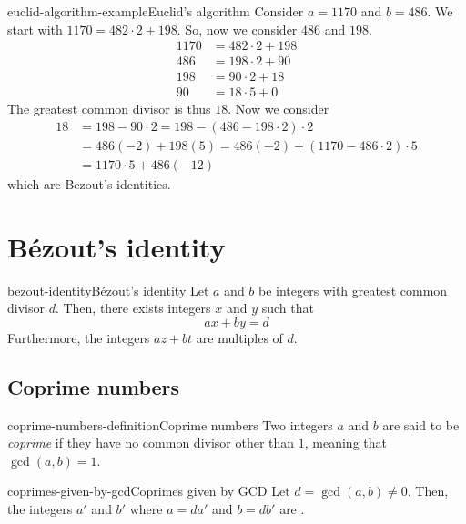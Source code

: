 \documentclass[preview]{standalone}
\begin{document}
\begin{snippetexample}{euclid-algorithm-example}{Euclid's algorithm}
    Consider \(a=1170\) and \(b=486\).
    We start with
    \(1170 = 482 \cdot 2 + 198\). So, now we consider \(486\) and \(198\).
    \begin{align*}
        1170 &= 482 \cdot 2 + 198 \\
        486 &= 198 \cdot 2 + 90 \\
        198 &= 90 \cdot 2 + 18 \\
        90 &= 18 \cdot 5 + 0
    \end{align*}
    The greatest common divisor is thus \(18\).
    Now we consider
    \begin{align*}
        18 &= 198 - 90\cdot 2 = 198 - (486 - 198 \cdot 2)\cdot 2 \\
        &= 486(-2) + 198(5) = 486(-2) + (1170 - 486\cdot 2) \cdot 5 \\
        &= 1170 \cdot 5 + 486(-12)
    \end{align*}
    which are Bezout's identities.
\end{snippetexample}

\section{Bézout's identity}

\begin{snippettheorem}{bezout-identity}{Bézout's identity}
    Let \(a\) and \(b\) be integers with greatest common divisor \(d\).
    Then, there exists integers \(x\) and \(y\) such that
    \[
        ax+by=d
    \]
    Furthermore, the integers \(az+bt\) are multiples of \(d\).
\end{snippettheorem}


\subsection{Coprime numbers}

\begin{snippetdefinition}{coprime-numbers-definition}{Coprime numbers}
    Two integers \(a\) and \(b\) are said to be \textit{coprime}
    if they have no common divisor other than \(1\), meaning that \(\gcd(a,b)=1\).
\end{snippetdefinition}

\begin{snippetproposition}{coprimes-given-by-gcd}{Coprimes given by GCD}
    Let \(d = \gcd(a, b) \neq 0\). Then, the integers \(a'\) and \(b'\) where \(a = da'\) and \(b = db'\)
    are \coprime.
\end{snippetproposition}
\end{document}
